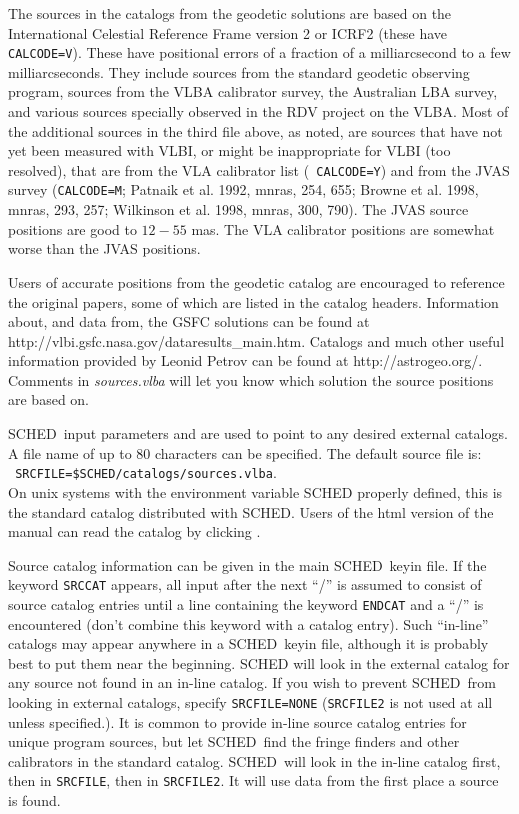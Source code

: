 \documentclass{report}
\newcommand{\sched}{{\sc SCHED}}
\newcommand{\schedb}{{\sc SCHED~}}
\begin{document}
The sources in the catalogs from the geodetic solutions are based on
the International Celestial Reference Frame version 2 or ICRF2 (these
have {\tt CALCODE=V}).  These have positional errors of a fraction of
a milliarcsecond to a few milliarcseconds.  They include sources from
the standard geodetic observing program, sources from the VLBA
calibrator survey, the Australian LBA survey, and various sources
specially observed in the RDV project on the VLBA.  Most of the
additional sources in the third file above, as noted, are sources that
have not yet been measured with VLBI, or might be inappropriate for
VLBI (too resolved), that are from the VLA calibrator list ({\tt
CALCODE=Y}) and from the JVAS survey ({\tt CALCODE=M}; Patnaik et
al. 1992, mnras, 254, 655; Browne et al. 1998, mnras, 293, 257;
Wilkinson et al. 1998, mnras, 300, 790).  The JVAS source positions
are good to $12-55$ mas.  The VLA calibrator positions are somewhat
worse than the JVAS positions.

Users of accurate positions from the geodetic catalog are encouraged
to reference the original papers, some of which are listed in the
catalog headers.  Information about, and data from, the GSFC solutions
can be found at
{http://vlbi.gsfc.nasa.gov/dataresults\_main.htm}.  Catalogs and much
other useful information provided by Leonid Petrov can be found at
 {http://astrogeo.org/}.
Comments in {\sl sources.vlba} will let you know which solution the
source positions are based on.

\schedb input parameters  and
 are used to point to any desired
external catalogs.  A file name of up to 80 characters can be
specified. The default source file is: \\ {\tt
SRCFILE=\$SCHED/catalogs/sources.vlba}.  \\ On unix systems with the
environment variable SCHED properly defined, this is the standard
catalog distributed with \sched.  Users of the html version of the
manual can read the catalog by clicking
.

Source catalog information can be given in the main \schedb keyin
file. If the keyword {\tt SRCCAT} appears, all input after the next
``/'' is assumed to consist of source catalog entries until a line
 containing the keyword {\tt ENDCAT} and a ``/'' is encountered (don't
combine this keyword with a catalog entry).  Such ``in-line'' catalogs
may appear anywhere in a \schedb keyin file, although it is probably
best to put them near the beginning.  {\sc SCHED} will look in the
external catalog for any source not found in an in-line catalog.  If
you wish to prevent \schedb from looking in external catalogs, specify
{\tt SRCFILE=NONE} ({\tt SRCFILE2} is not used at all unless
specified.).  It is common to provide in-line source catalog entries
for unique program sources, but let \schedb find the fringe finders
and other calibrators in the standard catalog.  \schedb will look in
the in-line catalog first, then in {\tt SRCFILE}, then in {\tt SRCFILE2}.
It will use data from the first place a source is found.
\end{document}
